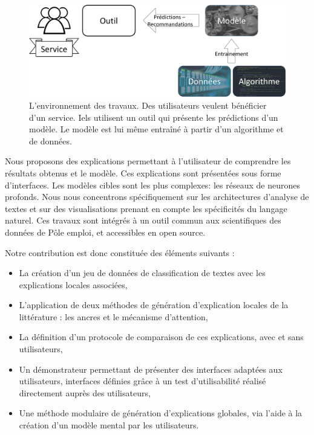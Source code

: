 \begin{figure}[htpb!]
    \centering
    \includegraphics[width=\textwidth]{Introduction/figures/environnement.png}
    \caption{L'environnement des travaux. Des utilisateurs veulent bénéficier d'un service. Iels utilisent un outil qui présente les prédictions d'un modèle. Le modèle est lui même entraîné à partir d'un algorithme et de données.}
    \label{fig:environnement}
\end{figure}

Nous proposons des explications permettant à l’utilisateur de comprendre les résultats obtenus et le modèle. Ces explications sont présentées sous forme d'interfaces.
Les modèles cibles sont les plus complexes: les réseaux de neurones profonds.
Nous nous concentrons spécifiquement sur les architectures d'analyse de textes et sur des visualisations prenant en compte les spécificités du langage naturel.
Ces travaux sont intégrés à un outil commun aux scientifiques des données de Pôle emploi, et accessibles en open source.

Notre contribution est donc constituée des éléments suivants :
\begin{itemize}
    \item La création d'un jeu de données de classification de textes avec les explications locales associées,
    \item L'application de deux méthodes de génération d'explication locales de la littérature : les ancres et le mécanisme d'attention,
    \item La définition d'un protocole de comparaison de ces explications, avec et sans utilisateurs,
    \item Un démonstrateur permettant de présenter des interfaces adaptées aux utilisateurs, interfaces définies grâce à un test d'utilisabilité réalisé directement auprès des utilisateurs,
    \item Une méthode modulaire de génération d'explications globales, via l'aide à la création d'un modèle mental par les utilisateurs.
\end{itemize}

